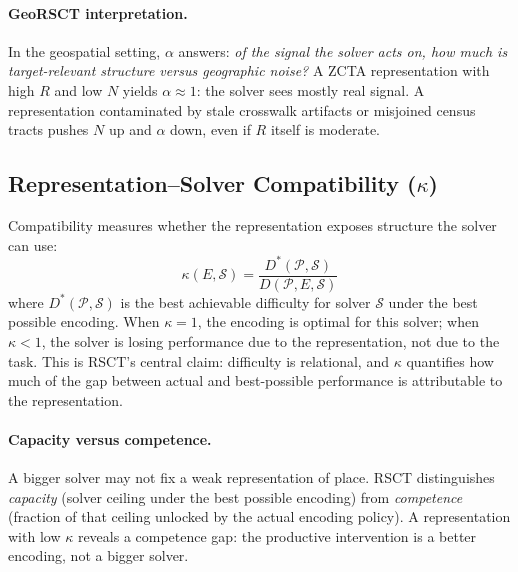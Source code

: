 \documentclass{article}
\begin{document}
\paragraph{GeoRSCT interpretation.} In the geospatial setting, $\alpha$ answers: \emph{of the signal the solver acts on, how much is target-relevant structure versus geographic noise?} A ZCTA representation with high $R$ and low $N$ yields $\alpha \approx 1$: the solver sees mostly real signal. A representation contaminated by stale crosswalk artifacts or misjoined census tracts pushes $N$ up and $\alpha$ down, even if $R$ itself is moderate.

\subsection{\texorpdfstring{Representation--Solver Compatibility ($\kappa$)}{Representation-Solver Compatibility (kappa)}}

Compatibility measures whether the representation exposes structure the solver can use:
\begin{equation}
\kappa(E,\mathcal{S}) = \frac{D^*(\mathcal{P},\mathcal{S})}{D(\mathcal{P},E,\mathcal{S})}
\end{equation}
where $D^*(\mathcal{P},\mathcal{S})$ is the best achievable difficulty for solver $\mathcal{S}$ under the best possible encoding. When $\kappa = 1$, the encoding is optimal for this solver; when $\kappa < 1$, the solver is losing performance due to the representation, not due to the task. This is RSCT's central claim: difficulty is relational, and $\kappa$ quantifies how much of the gap between actual and best-possible performance is attributable to the representation.

\paragraph{Capacity versus competence.} A bigger solver may not fix a weak representation of place. RSCT distinguishes \emph{capacity} (solver ceiling under the best possible encoding) from \emph{competence} (fraction of that ceiling unlocked by the actual encoding policy). A representation with low $\kappa$ reveals a competence gap: the productive intervention is a better encoding, not a bigger solver.
\end{document}

